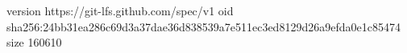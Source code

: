 version https://git-lfs.github.com/spec/v1
oid sha256:24bb31ea286c69d3a37dae36d838539a7e511ec3ed8129d26a9efda0e1c85474
size 160610
